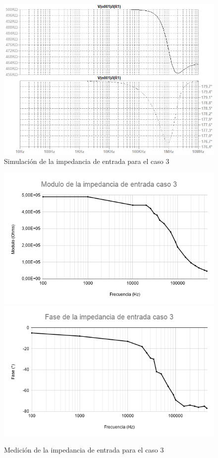 \begin{figure}[H]
\begin{centering}
\includegraphics[scale=0.5]{../Ex1/ib/Resources1b/zinp3_sim}
\par\end{centering}
\caption{Simulación de la impedancia de entrada para el caso 3}
\end{figure}

\begin{figure}[H]
\begin{centering}
\includegraphics[scale=0.4]{../Ex1/ib/Resources1b/zinp3_m_med}\includegraphics[scale=0.4]{../Ex1/ib/Resources1b/zinp3_p_med}
\par\end{centering}
\caption{Medición de la impedancia de entrada para el caso 3}
\end{figure}

